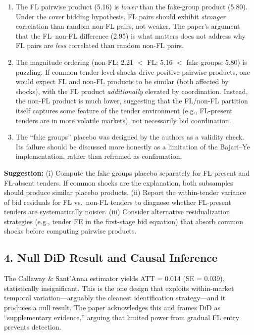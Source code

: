 \documentclass[12pt]{article}
\begin{document}
\begin{enumerate}[]
  \item The FL pairwise product (5.16) is \emph{lower} than the
    fake-group product (5.80). Under the cover bidding hypothesis, FL
    pairs should exhibit \emph{stronger} correlation than random
    non-FL pairs, not weaker. The paper's argument that the FL--non-FL
    difference (2.95) is what matters does not address why FL pairs are
    \emph{less} correlated than random non-FL pairs.

  \item The magnitude ordering (non-FL: 2.21 $<$ FL: 5.16 $<$
    fake-groups: 5.80) is puzzling. If common tender-level shocks drive
    positive pairwise products, one would expect FL and non-FL products
    to be similar (both affected by shocks), with the FL product
    \emph{additionally} elevated by coordination. Instead, the non-FL
    product is much lower, suggesting that the FL/non-FL partition itself
    captures some feature of the tender environment (e.g., FL-present
    tenders are in more volatile markets), not necessarily bid
    coordination.

  \item The ``fake groups'' placebo was designed by the authors as a
    validity check. Its failure should be discussed more honestly as a
    limitation of the Bajari--Ye implementation, rather than reframed as
    confirmation.
\end{enumerate}

\noindent\textbf{Suggestion:} (i) Compute the fake-groups placebo
separately for FL-present and FL-absent tenders. If common shocks are
the explanation, both subsamples should produce similar placebo products.
(ii) Report the within-tender variance of bid residuals for FL vs.\
non-FL tenders to diagnose whether FL-present tenders are systematically
noisier. (iii) Consider alternative residualization strategies (e.g.,
tender FE in the first-stage bid equation) that absorb common shocks
before computing pairwise products.


\subsection*{4. Null DiD Result and Causal Inference}

The Callaway \& Sant'Anna estimator yields ATT = 0.014 (SE = 0.039),
statistically insignificant. This is the one design that exploits
within-market temporal variation---arguably the cleanest identification
strategy---and it produces a null result. The paper acknowledges this
and frames DiD as ``supplementary evidence,'' arguing that limited power
from gradual FL entry prevents detection.
\end{document}
